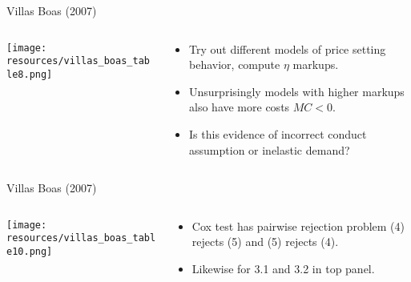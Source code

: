 \documentclass[aspectratio=169,10pt]{beamer}
\begin{document}
\begin{frame}{Villas Boas (2007)}

\begin{columns}
\begin{column}{0.5\textwidth}
\texttt{[image: resources/villas\_boas\_table8.png]}
\end{column}
\begin{column}{0.5\textwidth}
\begin{itemize}
\item Try out different models of price setting behavior, compute $\eta$ markups.
\item Unsurprisingly models with higher markups also have more costs $MC < 0$.
\item Is this evidence of incorrect conduct assumption or inelastic demand?
\end{itemize}
\end{column}
\end{columns}
\end{frame}

\begin{frame}{Villas Boas (2007)}
\begin{columns}
\begin{column}{0.6\textwidth}
\begin{center}
\texttt{[image: resources/villas\_boas\_table10.png]}
\end{center}
\end{column}
\begin{column}{0.4\textwidth}
\begin{itemize}
\item Cox test has pairwise rejection problem (4) rejects (5) and (5) rejects (4).
\item Likewise for 3.1 and 3.2 in top panel.
\end{itemize}
\end{column}
\end{columns}


\end{frame}
\end{document}
